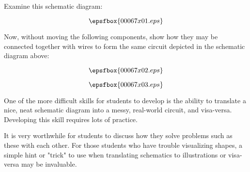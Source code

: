 

Examine this schematic diagram:

$$\epsfbox{00067x01.eps}$$

Now, without moving the following components, show how they may be connected together with wires to form the same circuit depicted in the schematic diagram above:

$$\epsfbox{00067x02.eps}$$







$$\epsfbox{00067x03.eps}$$







One of the more difficult skills for students to develop is the ability to translate a nice, neat schematic diagram into a messy, real-world circuit, and visa-versa.  Developing this skill requires lots of practice.

It is very worthwhile for students to discuss how they solve problems such as these with each other.  For those students who have trouble visualizing shapes, a simple hint or "trick" to use when translating schematics to illustrations or visa-versa may be invaluable.




